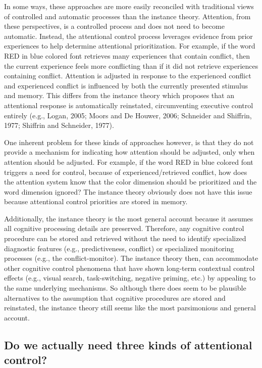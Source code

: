 \documentclass[]{DissertateCUNY}
\begin{document}
In some ways, these approaches are more easily reconciled with
traditional views of controlled and automatic processes than the
instance theory. Attention, from these perspectives, is a controlled
process and does not need to become automatic. Instead, the attentional
control process leverages evidence from prior experiences to help
determine attentional prioritization. For example, if the word RED in
blue colored font retrieves many experiences that contain conflict, then
the current experience feels more conflicting than if it did not
retrieve experiences containing conflict. Attention is adjusted in
response to the experienced conflict and experienced conflict is
influenced by both the currently presented stimulus and memory. This
differs from the instance theory which proposes that an attentional
response is automatically reinstated, circumventing executive control
entirely (e.g., Logan, 2005; Moors and De Houwer, 2006; Schneider and
Shiffrin, 1977; Shiffrin and Schneider, 1977).

One inherent problem for these kinds of approaches however, is that they
do not provide a mechanism for indicating how attention should be
adjusted, only when attention should be adjusted. For example, if the
word RED in blue colored font triggers a need for control, because of
experienced/retrieved conflict, how does the attention system know that
the color dimension should be prioritized and the word dimension
ignored? The instance theory obviously does not have this issue because
attentional control priorities are stored in memory.

Additionally, the instance theory is the most general account because it
assumes all cognitive processing details are preserved. Therefore, any
cognitive control procedure can be stored and retrieved without the need
to identify specialized diagnostic features (e.g., predictiveness,
conflict) or specialized monitoring processes (e.g., the
conflict-monitor). The instance theory then, can accommodate other
cognitive control phenomena that have shown long-term contextual control
effects (e.g., visual search, task-switching, negative priming, etc.) by
appealing to the same underlying mechanisms. So although there does seem
to be plausible alternatives to the assumption that cognitive procedures
are stored and reinstated, the instance theory still seems like the most
parsimonious and general account.

\hypertarget{do-we-actually-need-three-kinds-of-attentional-control}{%
\subsection{Do we actually need three kinds of attentional
control?}\label{do-we-actually-need-three-kinds-of-attentional-control}}
\end{document}
